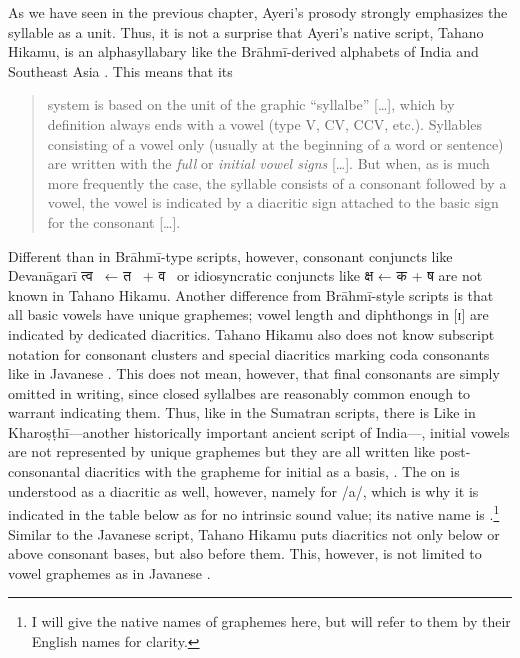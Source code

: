 As we have seen in the previous chapter, Ayeri's prosody strongly emphasizes 
the syllable as a unit. Thus, it is not a surprise that Ayeri's native script,
Tahano Hikamu, is an alphasyllabary like the Brāhmī-derived alphabets of India 
and Southeast Asia \parencites{salomon1996}{court1996}. 
This means that its 

\blockcquote[376]{salomon1996}{system is based on the unit of the graphic 
\enquote{syllalbe} […], which by definition always ends with a vowel (type V, 
CV, CCV, etc.). Syllables consisting of a vowel only (usually at the beginning 
of a word or sentence) are written with the \emph{full} or \emph{initial vowel 
signs} […]. But when, as is much more frequently the case, the syllable consists 
of a consonant followed by a vowel, the vowel is indicated by a diacritic sign 
attached to the basic sign for the consonant […].}

Different than in Brāhmī-type scripts, however, consonant conjuncts like 
Devanāgarī {\FS त्व}~ ← {\FS त}~ + {\FS व}~ or 
idiosyncratic conjuncts like {\FS क्ष}  ← {\FS क}  + {\FS ष} 
 are not known in Tahano Hikamu. Another difference from Brāhmī-style 
scripts is that all basic vowels have unique graphemes; vowel length and 
diphthongs in [ɪ] are indicated by dedicated diacritics. Tahano Hikamu also does 
not know subscript notation for consonant clusters and special diacritics 
marking coda consonants like in Javanese \citep[478--479]{kuipersmcdermott1996}. 
This does not mean, however, that final consonants are simply omitted in 
writing, since closed syllalbes are reasonably common enough to warrant 
indicating them. Thus, like in the Sumatran scripts, there is 
 Like in Kharoṣṭhī---another historically important ancient script 
of India---, initial vowels are not represented by unique graphemes but they 
are all written like post-consonantal diacritics with the grapheme for initial 
 as a basis,  \citep[377]{salomon1996}. The  on 
 is understood as a diacritic as well, however, namely for /a/, which is 
why it is indicated in the table below as   for no intrinsic 
sound value; its native name is .\footnote{I will 
give the native names of graphemes here, but will refer to them by their 
English names for clarity.} Similar to the Javanese script, Tahano Hikamu puts 
diacritics not only below or above consonant bases, but also before them. This, 
however, is not limited to vowel graphemes as in Javanese 
\citep[478]{kuipersmcdermott1996}.

